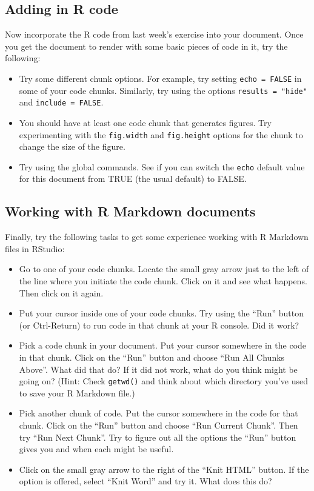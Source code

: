 \documentclass[]{book}
\providecommand{\tightlist}{%
  \setlength{\itemsep}{0pt}\setlength{\parskip}{0pt}}
\begin{document}
\subsection{Adding in R code}\label{adding-in-r-code}

Now incorporate the R code from last week's exercise into your document.
Once you get the document to render with some basic pieces of code in
it, try the following:

\begin{itemize}
\tightlist
\item
  Try some different chunk options. For example, try setting
  \texttt{echo\ =\ FALSE} in some of your code chunks. Similarly, try
  using the options \texttt{results\ =\ "hide"} and
  \texttt{include\ =\ FALSE}.
\item
  You should have at least one code chunk that generates figures. Try
  experimenting with the \texttt{fig.width} and \texttt{fig.height}
  options for the chunk to change the size of the figure.
\item
  Try using the global commands. See if you can switch the \texttt{echo}
  default value for this document from TRUE (the usual default) to
  FALSE.
\end{itemize}

\subsection{Working with R Markdown
documents}\label{working-with-r-markdown-documents}

Finally, try the following tasks to get some experience working with R
Markdown files in RStudio:

\begin{itemize}
\tightlist
\item
  Go to one of your code chunks. Locate the small gray arrow just to the
  left of the line where you initiate the code chunk. Click on it and
  see what happens. Then click on it again.
\item
  Put your cursor inside one of your code chunks. Try using the ``Run''
  button (or Ctrl-Return) to run code in that chunk at your R console.
  Did it work?
\item
  Pick a code chunk in your document. Put your cursor somewhere in the
  code in that chunk. Click on the ``Run'' button and choose ``Run All
  Chunks Above''. What did that do? If it did not work, what do you
  think might be going on? (Hint: Check \texttt{getwd()} and think about
  which directory you've used to save your R Markdown file.)
\item
  Pick another chunk of code. Put the cursor somewhere in the code for
  that chunk. Click on the ``Run'' button and choose ``Run Current
  Chunk''. Then try ``Run Next Chunk''. Try to figure out all the
  options the ``Run'' button gives you and when each might be useful.
\item
  Click on the small gray arrow to the right of the ``Knit HTML''
  button. If the option is offered, select ``Knit Word'' and try it.
  What does this do?
\end{itemize}
\end{document}
